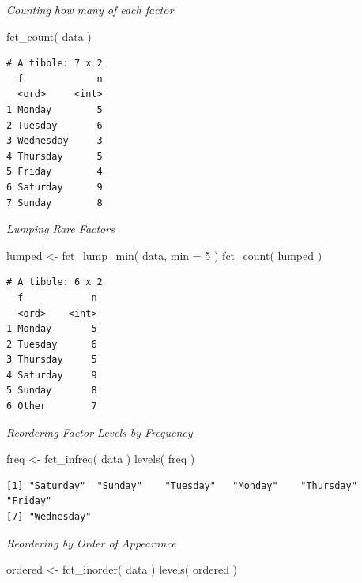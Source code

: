 \documentclass[
  letterpaper,
]{book}
\newenvironment{Shaded}{\begin{snugshade}}{\end{snugshade}}
\newcommand{\AttributeTok}[1]{\textcolor[rgb]{0.40,0.45,0.13}{#1}}
\newcommand{\DecValTok}[1]{\textcolor[rgb]{0.68,0.00,0.00}{#1}}
\newcommand{\FunctionTok}[1]{\textcolor[rgb]{0.28,0.35,0.67}{#1}}
\newcommand{\NormalTok}[1]{\textcolor[rgb]{0.00,0.23,0.31}{#1}}
\newcommand{\OtherTok}[1]{\textcolor[rgb]{0.00,0.23,0.31}{#1}}
\begin{document}
\emph{Counting how many of each factor}

\begin{Shaded}
\begin{Highlighting}[]
\FunctionTok{fct\_count}\NormalTok{( data )}
\end{Highlighting}
\end{Shaded}

\begin{verbatim}
# A tibble: 7 x 2
  f             n
  <ord>     <int>
1 Monday        5
2 Tuesday       6
3 Wednesday     3
4 Thursday      5
5 Friday        4
6 Saturday      9
7 Sunday        8
\end{verbatim}

\emph{Lumping Rare Factors}

\begin{Shaded}
\begin{Highlighting}[]
\NormalTok{lumped }\OtherTok{\textless{}{-}} \FunctionTok{fct\_lump\_min}\NormalTok{( data, }\AttributeTok{min =} \DecValTok{5}\NormalTok{ )}
\FunctionTok{fct\_count}\NormalTok{( lumped )}
\end{Highlighting}
\end{Shaded}

\begin{verbatim}
# A tibble: 6 x 2
  f            n
  <ord>    <int>
1 Monday       5
2 Tuesday      6
3 Thursday     5
4 Saturday     9
5 Sunday       8
6 Other        7
\end{verbatim}

\emph{Reordering Factor Levels by Frequency}

\begin{Shaded}
\begin{Highlighting}[]
\NormalTok{freq }\OtherTok{\textless{}{-}} \FunctionTok{fct\_infreq}\NormalTok{( data )}
\FunctionTok{levels}\NormalTok{( freq )}
\end{Highlighting}
\end{Shaded}

\begin{verbatim}
[1] "Saturday"  "Sunday"    "Tuesday"   "Monday"    "Thursday"  "Friday"   
[7] "Wednesday"
\end{verbatim}

\emph{Reordering by Order of Appearance}

\begin{Shaded}
\begin{Highlighting}[]
\NormalTok{ordered }\OtherTok{\textless{}{-}} \FunctionTok{fct\_inorder}\NormalTok{( data )}
\FunctionTok{levels}\NormalTok{( ordered )}
\end{Highlighting}
\end{Shaded}
\end{document}
